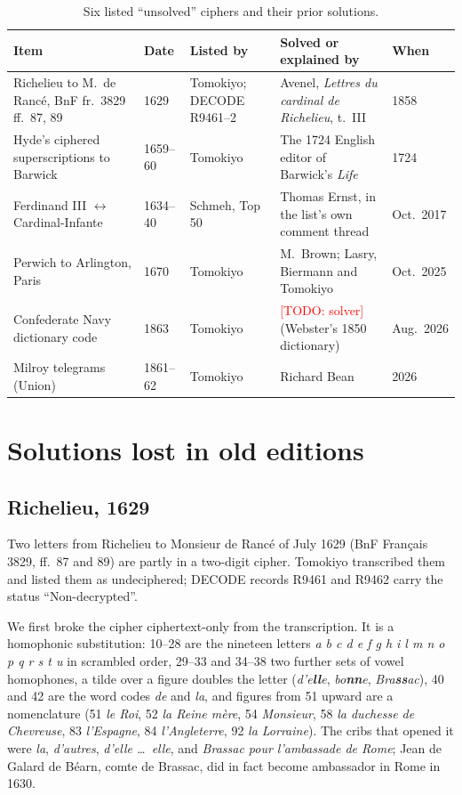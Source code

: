 \documentclass[11pt]{article}
\newcommand{\todo}[1]{\textcolor{red}{[TODO: #1]}}
\begin{document}
\begin{table}[t]
\centering\small
\begin{tabular}{@{}lllll@{}}
\toprule
Item & Date & Listed by & Solved or explained by & When \\
\midrule
Richelieu to M.~de Ranc\'e, BnF fr.~3829 ff.~87, 89 & 1629 & Tomokiyo; DECODE R9461--2 & Avenel, \emph{Lettres du cardinal de Richelieu}, t.~III & 1858 \\
Hyde's ciphered superscriptions to Barwick & 1659--60 & Tomokiyo & The 1724 English editor of Barwick's \emph{Life} & 1724 \\
Ferdinand III $\leftrightarrow$ Cardinal-Infante & 1634--40 & Schmeh, Top 50 & Thomas Ernst, in the list's own comment thread & Oct.~2017 \\
Perwich to Arlington, Paris & 1670 & Tomokiyo & M.~Brown; Lasry, Biermann and Tomokiyo & Oct.~2025 \\
Confederate Navy dictionary code & 1863 & Tomokiyo & \todo{solver} (Webster's 1850 dictionary) & Aug.~2026 \\
Milroy telegrams (Union) & 1861--62 & Tomokiyo & Richard Bean & 2026 \\
\bottomrule
\end{tabular}
\caption{\label{tab:six} Six listed ``unsolved'' ciphers and their prior solutions.}
\end{table}

\section{Solutions lost in old editions}\label{sec:old}

\subsection{Richelieu, 1629}

Two letters from Richelieu to Monsieur de Ranc\'e of July 1629 (BnF Fran\c{c}ais 3829, ff.~87 and 89) are partly in a two-digit cipher. Tomokiyo transcribed them and listed them as undeciphered; DECODE records R9461 and R9462 carry the status ``Non-decrypted''.

We first broke the cipher ciphertext-only from the transcription. It is a homophonic substitution: 10--28 are the nineteen letters \emph{a b c d e f g h i l m n o p q r s t u} in scrambled order, 29--33 and 34--38 two further sets of vowel homophones, a tilde over a figure doubles the letter (\emph{d'e\textbf{ll}e}, \emph{bo\textbf{nn}e}, \emph{Bra\textbf{ss}ac}), 40 and 42 are the word codes \emph{de} and \emph{la}, and figures from 51 upward are a nomenclature (51 \emph{le Roi}, 52 \emph{la Reine m\`ere}, 54 \emph{Monsieur}, 58 \emph{la duchesse de Chevreuse}, 83 \emph{l'Espagne}, 84 \emph{l'Angleterre}, 92 \emph{la Lorraine}). The cribs that opened it were \emph{la}, \emph{d'autres}, \emph{d'elle \ldots\ elle}, and \emph{Brassac pour l'ambassade de Rome}; Jean de Galard de B\'earn, comte de Brassac, did in fact become ambassador in Rome in 1630.
\end{document}
